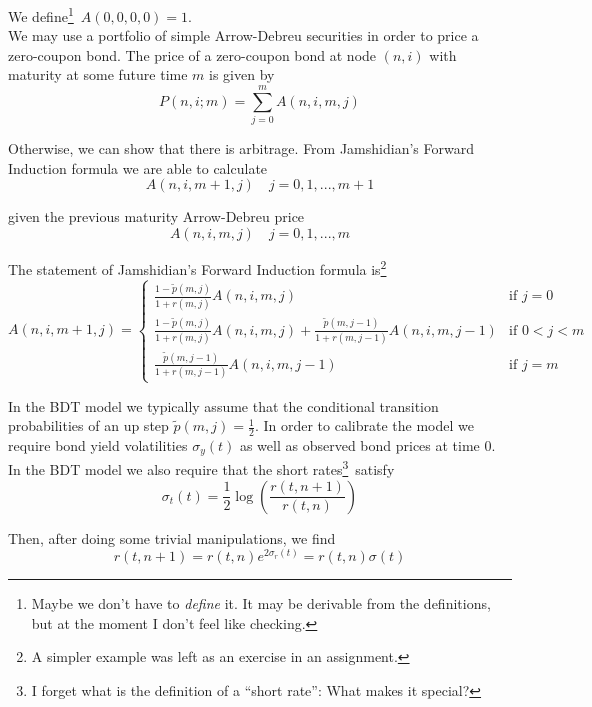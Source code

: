 \documentclass[12pt]{article}
\newlength\tindent
\renewcommand{\indent}{\hspace*{\tindent}}
\begin{document}
We define\footnote{Maybe we don't have to {\em define} it. It may be derivable from the definitions, but at the moment I don't feel like checking.}~$A(0,0,0,0) = 1$. \\

We may use a portfolio of simple Arrow-Debreu securities in order to price a zero-coupon bond. The price of a zero-coupon bond at node $(n,i)$ with maturity at some future time $m$ is given by
\begin{equation*}
	P(n,i;m) = \sum^m_{j = 0} A(n,i,m,j)
\end{equation*}

Otherwise, we can show that there is arbitrage. From Jamshidian's Forward Induction formula we are able to calculate
\begin{equation*}
	A(n,i,m + 1,j) \quad j = 0,1,...,m + 1
\end{equation*}

given the previous maturity Arrow-Debreu price
\begin{equation*}
	A(n,i,m,j) \quad j = 0,1,...,m
\end{equation*}

The statement of Jamshidian's Forward Induction formula is\footnote{A simpler example was left as an exercise in an assignment.}
\begin{equation*}
	A(n,i,m + 1,j) = 
	\begin{cases}
		\frac{1 - \tilde{p}(m,j)}{1 + r(m,j)} A(n,i,m,j) & \text{if } j = 0 \\
		\frac{1 - \tilde{p}(m,j)}{1 + r(m,j)} A(n,i,m,j) + \frac{\tilde{p}(m,j - 1)}{1 + r(m,j - 1)} A(n,i,m,j - 1) & \text{if } 0 < j < m \\
		\frac{\tilde{p}(m,j - 1)}{1 + r(m,j - 1)} A(n,i,m,j - 1) & \text{if } j = m
	\end{cases}
\end{equation*}

\indent In the BDT model we typically assume that the conditional transition probabilities of an up step $\tilde{p}(m,j) = \frac{1}{2}$. In order to calibrate the model we require bond yield volatilities $\sigma_y(t)$ as well as observed bond prices at time 0. In the BDT model we also require that the short rates\footnote{I forget what is the definition of a ``short rate'': What makes it special?}~satisfy
\begin{equation*}
	\sigma_t(t) = \frac{1}{2} \log \left( \frac{r(t,n + 1)}{r(t,n)} \right)
\end{equation*}

Then, after doing some trivial manipulations, we find
\begin{equation}
	r(t,n + 1) = r(t,n)e^{2\sigma_r(t)} = r(t,n)\sigma(t)
\end{equation} 
\end{document}

